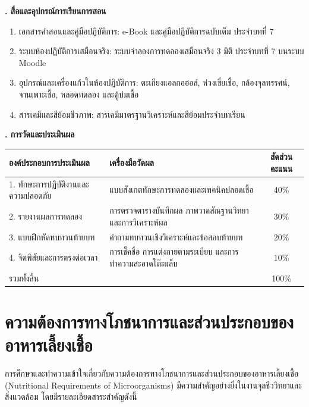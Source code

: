 \noindent\textbf{. สื่อและอุปกรณ์การเรียนการสอน}

\begin{enumerate}
    \item เอกสารคำสอนและคู่มือปฏิบัติการ: e-Book และคู่มือปฏิบัติการฉบับเต็ม ประจำบทที่ 7
    \item ระบบห้องปฏิบัติการเสมือนจริง: ระบบจำลองการทดลองเสมือนจริง 3 มิติ ประจำบทที่ 7 บนระบบ Moodle
    \item อุปกรณ์และเครื่องแก้วในห้องปฏิบัติการ: ตะเกียงแอลกอฮอล์, ห่วงเขี่ยเชื้อ, กล้องจุลทรรศน์, จานเพาะเชื้อ, หลอดทดลอง และตู้บ่มเชื้อ
    \item สารเคมีและสีย้อมชีวภาพ: สารเคมีมาตรฐานวิเคราะห์และสีย้อมประจำบทเรียน
\end{enumerate}

\noindent\textbf{. การวัดและประเมินผล}

\begin{table}[H]
\centering\small
\begin{tabularx}{\textwidth}{p{} p{} c}
\toprule
\textbf{องค์ประกอบการประเมินผล} & \textbf{เครื่องมือวัดผล} & \textbf{สัดส่วนคะแนน} \\
\midrule
1. ทักษะการปฏิบัติงานและความปลอดภัย & แบบสังเกตทักษะการทดลองและเทคนิคปลอดเชื้อ & 40\% \\
2. รายงานผลการทดลอง & การตรวจตารางบันทึกผล ภาพวาดสัณฐานวิทยา และการวิเคราะห์ผล & 30\% \\
3. แบบฝึกหัดทบทวนท้ายบท & คำถามทบทวนเชิงวิเคราะห์และข้อสอบท้ายบท & 20\% \\
4. จิตพิสัยและการตรงต่อเวลา & การเช็คชื่อ การแต่งกายตามระเบียบ และการทำความสะอาดโต๊ะแล็บ & 10\% \\
รวมทั้งสิ้น &  & 100\% \\
\bottomrule
\end{tabularx}
\end{table}

\newpage


\section{ความต้องการทางโภชนาการและส่วนประกอบของอาหารเลี้ยงเชื้อ}

การศึกษาและทำความเข้าใจเกี่ยวกับความต้องการทางโภชนาการและส่วนประกอบของอาหารเลี้ยงเชื้อ (Nutritional Requirements of Microorganisms) มีความสำคัญอย่างยิ่งในงานจุลชีววิทยาและสิ่งแวดล้อม โดยมีรายละเอียดสาระสำคัญดังนี้

